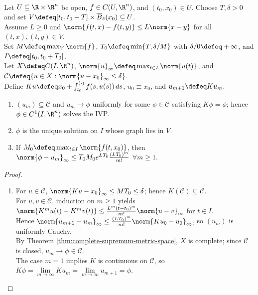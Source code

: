 \begin{theorem} \label{thm:quantitative-vector-picard-lindelof} \\
Let $U\subseteq\R\times\R^n$ be open, $f\in C(U,\R^n)$, and $(t_0,x_0)\in U$. Choose $T,\delta>0$ and set $V\defeq[t_0,t_0+T]\times\overline{B}_\delta(x_0)\subseteq U$.\\
Assume $L\geq0$ and $\norm{f(t,x)-f(t,y)}\leq L\norm{x-y}$ for all $(t,x),(t,y)\in V$.\\
Set $M\defeq\max_V\norm{f}$, $T_0\defeq\min\{T,\delta/M\}$ with $\delta/0\defeq+\infty$, and $I\defeq[t_0,t_0+T_0]$.\\
Let $X\defeq C(I,\R^n)$, $\norm{u}_\infty\defeq\max_{t\in I}\norm{u(t)}$, and $\mathcal{C}\defeq\{u\in X:\norm{u-x_0}_\infty\leq\delta\}$.\\
Define $Ku\defeq x_0+\int_{t_0}^{(\cdot)} f(s,u(s))\,ds$, $u_0\equiv x_0$, and $u_{m+1}\defeq Ku_m$.
\begin{enumerate}[label=(\roman*)]
\setlength{\itemsep}{0pt}
\item $(u_m)\subseteq\mathcal{C}$ and $u_m\to\phi$ uniformly for some $\phi\in\mathcal{C}$ satisfying $K\phi=\phi$; hence $\phi\in C^1(I,\R^n)$ solves the IVP.
\item $\phi$ is the unique solution on $I$ whose graph lies in $V$.
\item If $M_0\defeq\max_{t\in I}\norm{f(t,x_0)}$, then $\norm{\phi-u_m}_\infty\leq T_0M_0e^{LT_0}\frac{(LT_0)^m}{m!}$ $\forall m\geq1$.
\end{enumerate}
\begin{proof}
\begin{enumerate}[label=(\roman*)]
\setlength{\itemsep}{0pt}
\item For $u\in\mathcal{C}$, $\norm{Ku-x_0}_\infty\leq MT_0\leq\delta$; hence $K(\mathcal{C})\subseteq\mathcal{C}$.\\
For $u,v\in\mathcal{C}$, induction on $m\geq1$ yields $\norm{K^mu(t)-K^mv(t)}\leq\frac{L^m(t-t_0)^m}{m!}\norm{u-v}_\infty$ for $t\in I$.\\
Hence $\norm{u_{m+1}-u_m}_\infty\leq\frac{(LT_0)^m}{m!}\norm{Ku_0-u_0}_\infty$, so $(u_m)$ is uniformly Cauchy.\\
By Theorem \ref{thm:complete-supremum-metric-space}, $X$ is complete; since $\mathcal{C}$ is closed, $u_m\to\phi\in\mathcal{C}$.\\
The case $m=1$ implies $K$ is continuous on $\mathcal{C}$, so $K\phi=\lim\limits_{m\to\infty}Ku_m=\lim\limits_{m\to\infty}u_{m+1}=\phi$.\\

\end{enumerate}
\end{proof}
\end{theorem}
